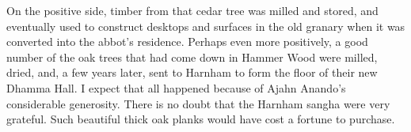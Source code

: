 On the positive side, timber from that cedar tree was milled and stored,
and eventually used to construct desktops and surfaces in the old
granary when it was converted into the abbot's residence. Perhaps even
more positively, a good number of the oak trees that had come down in
Hammer Wood were milled, dried, and, a few years later, sent to
Harnham to form the floor of their new Dhamma Hall. I expect that all
happened because of Ajahn Anando's considerable generosity. There is no
doubt that the Harnham sangha were very grateful. Such beautiful thick
oak planks would have cost a fortune to purchase.



